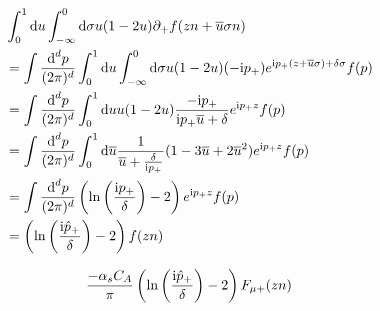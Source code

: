 \begin{align}
	&\int_0^1 \text{d} u \int _{-\infty}^0 \text{d} \sigma u (1-2u) \partial_+ f(zn+\overline u \sigma n)
	\\
	&=
	\int \frac{\text{d} ^d p}{(2\pi)^d}  \int_0^1 \text{d} u \int _{-\infty}^0 \text{d} \sigma u (1-2u) (-\text{i} p_{+}) e^{\text{i} p_{+}(z+\overline u \sigma ) + \delta \sigma} f(p)
	\\
	&=
	\int \frac{\text{d} ^d p}{(2\pi)^d}  \int_0^1 \text{d} u  u (1-2u)  \frac{-\text{i} p_{+}}{\text{i} p_{+} \overline u + \delta} e^{\text{i} p_{+} z} f(p)
	\\
	&=
	\int \frac{\text{d} ^d p}{(2\pi)^d}  \int_0^1 \text{d} \overline u   \frac{1}{\overline u + \frac{\delta}{\text{i} p_{+}}}(1-3\overline u +2\overline u^2) e^{\text{i} p_{+} z} f(p)
	\\
	&=
	\int \frac{\text{d} ^d p}{(2\pi)^d}  \left(\ln\left(\frac{\text{i} p_{+}}{\delta}\right)-2\right) e^{\text{i} p_{+} z} f(p)
	\\
	&=
	\left(\ln\left(\frac{\text{i} \hat p_{+}}{\delta}\right)-2\right) f(zn)
\end{align}

\begin{align}
	\frac{-\alpha_s C_A}{\pi}\left(\ln\left(\frac{\text{i} \hat p_{+}}{\delta}\right)-2\right) F_{\mu +}(zn)
\end{align}

